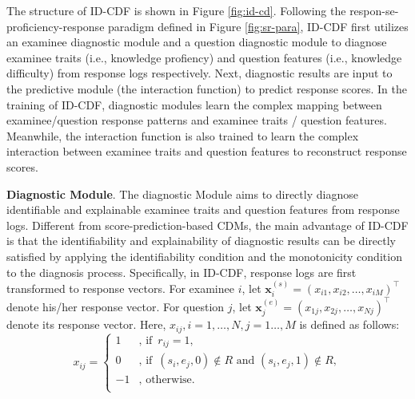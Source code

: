 \documentclass[sigconf]{acmart}
\begin{document}
\par The structure of ID-CDF is shown in Figure \ref{fig:id-cd}. Following the respon-se-proficiency-response paradigm defined in Figure \ref{fig:sr-para}, ID-CDF first utilizes an examinee diagnostic module and a question diagnostic module to diagnose examinee traits (i.e., knowledge profiency) and question features (i.e., knowledge difficulty) from response logs respectively. Next, diagnostic results are input to the predictive module (the interaction function) to predict response scores. In the training of ID-CDF, diagnostic modules learn the complex mapping between examinee/question response patterns and examinee traits / question features. Meanwhile, the interaction function is also trained to learn the complex interaction between examinee traits and question features to reconstruct response scores. 


\par \textbf{Diagnostic Module}. The diagnostic Module aims to directly diagnose identifiable and explainable examinee traits and question features from response logs. Different from score-prediction-based CDMs, the main advantage of ID-CDF is that the identifiability and explainability of diagnostic results can be directly satisfied by applying the identifiability condition and the monotonicity condition to the diagnosis process. Specifically, in ID-CDF, response logs are first transformed to response vectors. For examinee $i$, let $\bm{x}_i^{(s)} = (x_{i1}, x_{i2},\ldots,x_{iM})^\top$ denote his/her response vector. For question $j$, let $\bm{x}_j^{(e)} = (x_{1j},x_{2j},\ldots,x_{Nj})^\top$ denote its response vector. Here, $x_{ij},i=1,\ldots,N,j=1\ldots,M$ is defined as follows:
\begin{equation}\label{eq:r2x}
  x_{ij}=\left\{\begin{aligned}
    1&,\, \text{if}\,\,\, r_{ij}=1,\\
    0&,\, \text{if}\,\,\, (s_i,e_j,0)\notin R\,\,\text{and}\,\,(s_i,e_j,1)\notin R,\\
    -1&,\, \text{otherwise}.\\
  \end{aligned}\right.
\end{equation}
\end{document}
